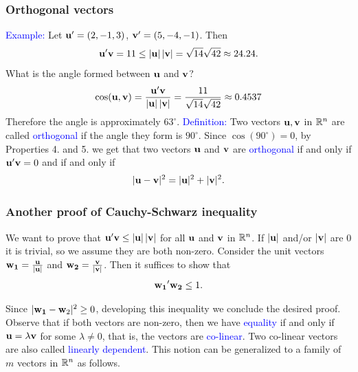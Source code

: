 \documentclass[11pt,aspectratio=169]{beamer}
\begin{document}
\begin{frame}
\frametitle{Orthogonal vectors}
\begin{small}
\textcolor{blue}{Example:} Let ${\bf u}'=(2, -1, 3)$, ${\bf v}'=(5,-4,-1)$. Then
$$
{\bf u}' {\bf v}=11\leq \vert {\bf u} \vert \, \vert {\bf v} \vert=\sqrt{14} \sqrt{42} \approx 24.24.
$$
What is the angle formed between $\bf{u}$ and $\bf{v}$?
$$
\cos ({\bf u}, {\bf v})=\frac{{\bf u}' {\bf v}}{\vert {\bf u} \vert \, \vert {\bf v}\vert}=\frac{11}{\sqrt{14} \sqrt{42}} \approx 0.4537
$$
Therefore the angle is approximately $63^{\circ}$.
\vskip 12pt
\textcolor{blue}{Definition:} Two vectors ${\bf u}, {\bf v}$ in $\mathbb R^n$ are called \textcolor{blue}{orthogonal} if
the angle they form is $90^{\circ}$. 
\vskip 12pt
Since $\cos(90^{\circ})=0$, by Properties 4. and 5. we get  that two vectors  ${\bf u}$ and ${\bf v}$ are \textcolor{blue}{orthogonal} if and only if  ${\bf u}' {\bf v}=0$ and if and only if
$$
\vert {\bf u}- {\bf v}\vert^2=\vert {\bf u} \vert^2 +\vert {\bf v}\vert^2.
$$


\end{small}
\end{frame}


\begin{frame}
\frametitle{Another proof of Cauchy-Schwarz inequality}
\begin{small}
We want to prove that ${\bf u}' {\bf v} \leq  \vert {\bf  u} \vert \, \vert {\bf v} \vert$ for all $\bf{u}$ and $\bf{v}$ in $\mathbb R^n$.
\vskip 12pt
If $\vert \bf{u} \vert$ and/or $\vert \bf{v} \vert$ are 0 it is trivial, so we assume they are both non-zero.
\vskip 12pt
Consider  the unit vectors $\bf{w_1}=\frac{\bf{u}}{\vert \bf{u} \vert}$ and
$\bf{w_2}=\frac{\bf{v}}{\vert \bf{v} \vert}$. Then it suffices to show that  
$${\bf w_1}' {\bf w_2} \leq  1.$$


Since $\vert {\bf w_1}-{\bf w}_2 \vert^2 \geq 0$, developing this inequality  we  conclude the desired proof.
\vskip 12pt
 Observe that if both vectors are non-zero, then we have \textcolor{blue}{equality}  if and only if $\bf{u}=\lambda \bf{v}$
for some $\lambda \neq 0$, that is, the vectors are  \textcolor{blue}{co-linear}. 
\vskip 12pt
Two co-linear vectors are also called \textcolor{blue}{linearly dependent}. This notion can be  generalized to a family of $m$ vectors in $\mathbb R^n$ as follows.

\end{small}
\end{frame}
\end{document}
